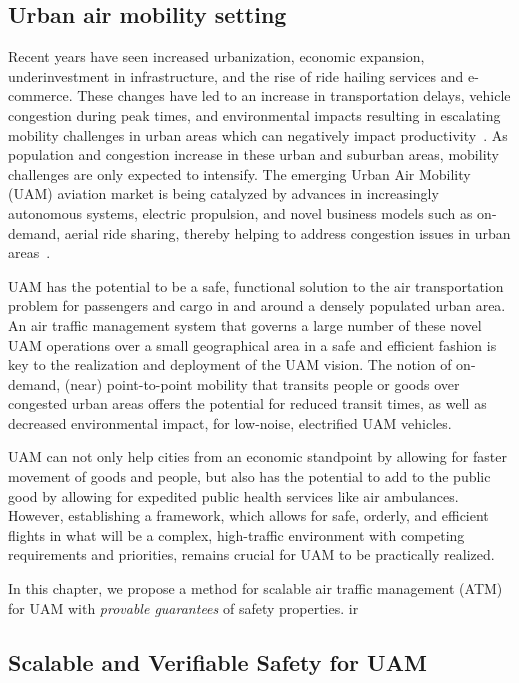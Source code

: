 
\subsection{Urban air mobility setting}
Recent years have seen increased urbanization, economic expansion, underinvestment in infrastructure, and the rise of ride hailing services and e-commerce.  These changes have led to an increase in transportation delays, vehicle congestion during peak times, and environmental impacts resulting in escalating mobility challenges in urban areas which can negatively impact productivity~\cite{harriet2013assessment}. As population and congestion increase in these urban and suburban areas, mobility challenges are only expected to intensify. The emerging Urban Air Mobility (UAM) aviation market is being catalyzed by advances in increasingly autonomous systems, electric propulsion, and novel business models such as on-demand, aerial ride sharing, thereby helping to address congestion issues in urban areas~\cite{flightplan2030}.  

UAM has the potential to be a safe, functional solution to the air transportation problem for passengers and cargo in and around a densely populated urban area.  An air traffic management system that governs a large number of these novel UAM operations over a small geographical area in a safe and efficient fashion is key to the realization and deployment of the UAM vision.  The notion of on-demand, (near) point-to-point mobility that transits people or goods over congested urban areas offers the potential for reduced transit times, as well as decreased environmental impact, for low-noise, electrified UAM vehicles.  

UAM can not only help cities from an economic standpoint by allowing for faster movement of goods and people, but also has the potential to add to the public good by allowing for expedited public health services like air ambulances. However, establishing a framework, which allows for safe, orderly, and efficient flights in what will be a complex, high-traffic environment with competing requirements and priorities, remains crucial for UAM to be practically realized. 

In this chapter, we propose a method for scalable air traffic management (ATM) for UAM with \emph{provable guarantees} of safety properties. ir 


\subsection{Scalable and Verifiable Safety for UAM}

